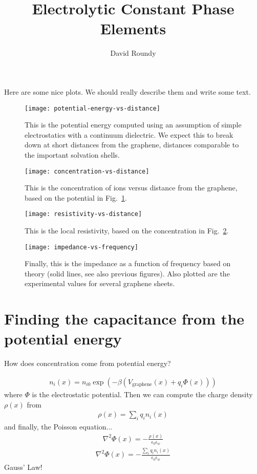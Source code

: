 \documentclass[twocolumn]{article}
\title{Electrolytic Constant Phase Elements}
\author{David Roundy}
\begin{document}
\maketitle

Here are some nice plots.  We should really describe them and write
some text.

\begin{figure}
  \texttt{[image: potential-energy-vs-distance]}
  \caption{This is the potential energy computed using an assumption
    of simple electrostatics with a continuum dielectric.  We expect
    this to break down at short distances from the graphene, distances
    comparable to the important solvation shells.}
  \label{fig:pot}
\end{figure}

\begin{figure}
  \texttt{[image: concentration-vs-distance]}
  \caption{This is the concentration of ions versus distance from the
    graphene, based on the potential in Fig.~\ref{fig:pot}.}
  \label{fig:concentration}
\end{figure}

\begin{figure}
  \texttt{[image: resistivity-vs-distance]}
  \caption{This is the local resistivity, based on the concentration
    in Fig.~\ref{fig:concentration}.}
\end{figure}

\begin{figure}
  \texttt{[image: impedance-vs-frequency]}
  \caption{Finally, this is the impedance as a function of frequency
    based on theory (solid lines, see also previous figures).  Also
    plotted are the experimental values for several graphene sheets.}
\end{figure}

\afterpage{\clearpage}

\clearpage

\section{Finding the capacitance from the potential energy}

How does concentration come from potential energy?

\begin{align}
  n_i(x) = n_{i0} \exp\left(-\beta \left(V_{\text{graphene}}(x)
                                       + q_i \Phi(x)\right)\right)
\end{align}
where $\Phi$ is the electrostatic potential.  Then we can compute the
charge density $\rho(x)$ from
\begin{align}
  \rho(x) = \sum_i q_i n_i(x)
\end{align}
and finally, the Poisson equation...
\begin{align}
  \nabla^2 \Phi(x) = -\frac{\rho(x)}{\epsilon_0\epsilon_w}
\end{align}
\begin{align}
  \nabla^2 \Phi(x) = -\frac{\sum_i q_i n_i(x)}{\epsilon_0\epsilon_w}
\end{align}
Gauss' Law!
\end{document}
